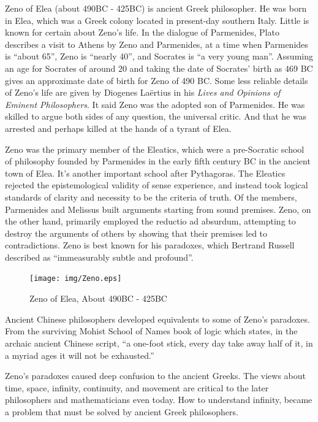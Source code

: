 \documentclass{article}
\begin{document}
Zeno of Elea (about 490BC - 425BC) is ancient Greek philosopher.
He was born in Elea, which was a Greek colony located in present-day southern Italy. Little is known for certain about Zeno's life. In the dialogue of Parmenides, Plato describes a visit to Athens by Zeno and Parmenides, at a time when Parmenides is ``about 65'', Zeno is ``nearly 40'', and Socrates is ``a very young man''. Assuming an age for Socrates of around 20 and taking the date of Socrates' birth as 469 BC gives an approximate date of birth for Zeno of 490 BC. Some less reliable details of Zeno's life are given by Diogenes Laërtius in his {\em Lives and Opinions of Eminent Philosophers}. It said Zeno was the adopted son of Parmenides. He was skilled to argue both sides of any question, the universal critic. And that he was arrested and perhaps killed at the hands of a tyrant of Elea\cite{HanXueTao16}.

Zeno was the primary member of the Eleatics, which were a pre-Socratic school of philosophy founded by Parmenides in the early fifth century BC in the ancient town of Elea. It's another important school after Pythagoras. The Eleatics rejected the epistemological validity of sense experience, and instead took logical standards of clarity and necessity to be the criteria of truth. Of the members, Parmenides and Melissus built arguments starting from sound premises. Zeno, on the other hand, primarily employed the reductio ad absurdum, attempting to destroy the arguments of others by showing that their premises led to contradictions. Zeno is best known for his paradoxes, which Bertrand Russell described as ``immeasurably subtle and profound''.

\begin{figure}[htbp]
 \centering
 \texttt{[image: img/Zeno.eps]}
 \captionsetup{labelformat=empty}
 \caption{Zeno of Elea, About 490BC - 425BC}
 \label{fig:Zeno-of-Elea}
\end{figure}

Ancient Chinese philosophers developed equivalents to some of Zeno's paradoxes. From the surviving Mohist School of Names book of logic which states, in the archaic ancient Chinese script, ``a one-foot stick, every day take away half of it, in a myriad ages it will not be exhausted.''

Zeno's paradoxes caused deep confusion to the ancient Greeks. The views about time, space, infinity, continuity, and movement are critical to the later philosophers and mathematicians even today. How to understand infinity, became a problem that must be solved by ancient Greek philosophers.
\end{document}
